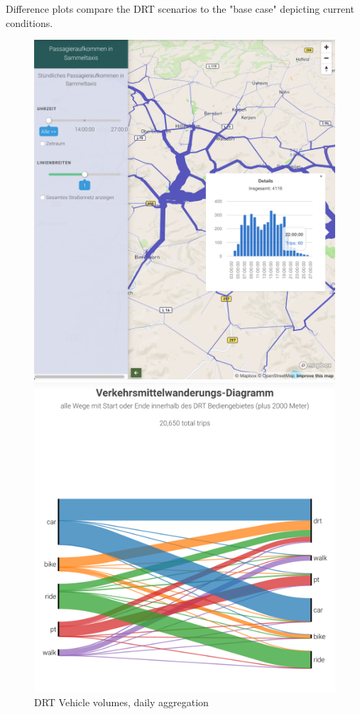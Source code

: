 Difference plots compare the DRT scenarios to the "base case" depicting current conditions.

\begin{figure}[ht]
  \centering
  \begin{minipage}[c]{0.32\textwidth}
     \includegraphics[width=\linewidth]{chapters/22-avov/images/fig-link-vols.png}
     \caption{DRT Vehicle volumes, daily aggregation }
     \label{fig:pave-vehicles-daily}
  \end{minipage}
  \begin{minipage}[c]{0.32\textwidth}
     \includegraphics[width=\linewidth]{chapters/22-avov/images/fig-mode-share.png}

\end{minipage}
\end{figure}

